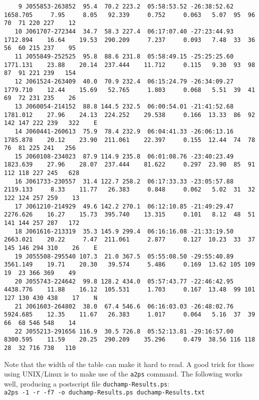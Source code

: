 \begin{landscape}
{\begin{verbatim}
    9 J055853-263852  95.4  70.2 223.2  05:58:53.52 -26:38:52.62 1658.705     7.95     8.05   92.339     0.752     0.063   5.07  95  96  70  71 220 227    12     
   10 J061707-272344  34.7  58.3 227.4  06:17:07.40 -27:23:44.93 1712.894    16.64    19.53  290.209     7.237     0.093   7.48  33  36  56  60 215 237    95     
   11 J055849-252525  95.8  88.6 231.8  05:58:49.15 -25:25:25.60 1771.131    23.88    20.14  237.444    11.712     0.115   9.30  93  98  87  91 221 239   154     
   12 J061524-263409  40.0  70.9 232.4  06:15:24.79 -26:34:09.27 1779.710    12.44    15.69   52.765     1.803     0.068   5.51  39  41  69  72 231 235    26     
   13 J060054-214152  88.8 144.5 232.5  06:00:54.01 -21:41:52.68 1781.012    27.96    24.13  224.252    29.538     0.166  13.33  86  92 142 147 222 239   322    E
   14 J060441-260613  75.9  78.4 232.9  06:04:41.33 -26:06:13.16 1785.878    20.12    23.90  211.061    22.397     0.155  12.44  74  78  76  81 225 241   256     
   15 J060108-234023  87.9 114.9 235.8  06:01:08.76 -23:40:23.49 1823.639    27.96    28.07  237.444    81.622     0.297  23.90  85  91 112 118 227 245   628     
   16 J061733-230557  31.4 122.7 258.2  06:17:33.33 -23:05:57.88 2119.133     8.33    11.77   26.383     0.848     0.062   5.02  31  32 122 124 257 259    13     
   17 J061210-214929  49.6 142.2 270.1  06:12:10.85 -21:49:29.47 2276.626    16.27    15.73  395.740    13.315     0.101   8.12  48  51 141 144 257 287   172     
   18 J061616-213319  35.3 145.9 299.4  06:16:16.08 -21:33:19.50 2663.021    20.22     7.47  211.061     2.877     0.127  10.23  33  37 145 146 294 310    26    E
   19 J055508-295540 107.3  21.0 367.5  05:55:08.50 -29:55:40.89 3561.149    19.71    20.30   39.574     5.486     0.169  13.62 105 109  19  23 366 369    49     
   20 J055743-224642  99.8 128.2 434.0  05:57:43.77 -22:46:42.95 4438.776    11.88    16.12  105.531     1.703     0.167  13.48  99 101 127 130 430 438    17    N
   21 J061603-264802  38.0  67.4 546.6  06:16:03.03 -26:48:02.76 5924.685    12.35    11.67   26.383     1.017     0.064   5.16  37  39  66  68 546 548    14     
   22 J055213-291656 116.9  30.5 726.8  05:52:13.81 -29:16:57.00 8300.595    11.59    20.25  290.209    35.296     0.479  38.56 116 118  28  32 716 738   110     
  \end{verbatim}
}

Note that the width of the table can make it hard to read. A good
trick for those using UNIX/Linux is to make use of the \texttt{a2ps}
command. The following works well, producing a postscript file
\texttt{duchamp-Results.ps}:
\\\verb|a2ps -1 -r -f7 -o duchamp-Results.ps duchamp-Results.txt|
\end{landscape}
